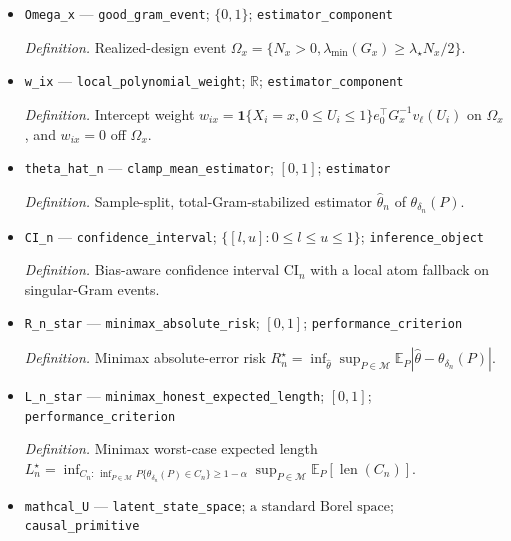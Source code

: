 \documentclass{article}
\begin{document}
\begin{itemize}
  \item \texttt{Omega\_\allowbreak{}x} --- \texttt{good\_\allowbreak{}gram\_\allowbreak{}event}; \(\{0,1\}\); \texttt{estimator\_\allowbreak{}component}
  \par\smallskip\noindent\emph{Definition.} Realized-design event \(\Omega_x=\{N_x>0,\lambda_{\min}(G_x)\geq\lambda_\star N_x/2\}\).
  \item \texttt{w\_\allowbreak{}ix} --- \texttt{local\_\allowbreak{}polynomial\_\allowbreak{}weight}; \(\mathbb R\); \texttt{estimator\_\allowbreak{}component}
  \par\smallskip\noindent\emph{Definition.} Intercept weight \(w_{ix}=\mathbf 1\{X_i=x,0\leq U_i\leq1\}e_0^\top G_x^{-1}v_\ell(U_i)\) on \(\Omega_x\), and \(w_{ix}=0\) off \(\Omega_x\).
  \item \texttt{theta\_\allowbreak{}hat\_\allowbreak{}n} --- \texttt{clamp\_\allowbreak{}mean\_\allowbreak{}estimator}; \([0,1]\); \texttt{estimator}
  \par\smallskip\noindent\emph{Definition.} Sample-split, total-Gram-stabilized estimator \(\widehat\theta_n\) of \(\theta_{\delta_n}(P)\).
  \item \texttt{CI\_\allowbreak{}n} --- \texttt{confidence\_\allowbreak{}interval}; \(\{[l,u]:0\leq l\leq u\leq1\}\); \texttt{inference\_\allowbreak{}object}
  \par\smallskip\noindent\emph{Definition.} Bias-aware confidence interval \(\mathrm{CI}_n\) with a local atom fallback on singular-Gram events.
  \item \texttt{R\_\allowbreak{}n\_\allowbreak{}star} --- \texttt{minimax\_\allowbreak{}absolute\_\allowbreak{}risk}; \([0,1]\); \texttt{performance\_\allowbreak{}criterion}
  \par\smallskip\noindent\emph{Definition.} Minimax absolute-error risk \(R_n^\star=\inf_{\widehat\theta}\sup_{P\in\mathcal M}\mathbb E_P|\widehat\theta-\theta_{\delta_n}(P)|\).
  \item \texttt{L\_\allowbreak{}n\_\allowbreak{}star} --- \texttt{minimax\_\allowbreak{}honest\_\allowbreak{}expected\_\allowbreak{}length}; \([0,1]\); \texttt{performance\_\allowbreak{}criterion}
  \par\smallskip\noindent\emph{Definition.} Minimax worst-case expected length \(L_n^\star=\inf_{C_n:\,\inf_{P\in\mathcal M}P\{\theta_{\delta_n}(P)\in C_n\}\geq1-\alpha}\sup_{P\in\mathcal M}\mathbb E_P[\operatorname{len}(C_n)]\).
  \item \texttt{mathcal\_\allowbreak{}U} --- \texttt{latent\_\allowbreak{}state\_\allowbreak{}space}; \(\text{a standard Borel space}\); \texttt{causal\_\allowbreak{}primitive}

\end{itemize}
\end{document}

